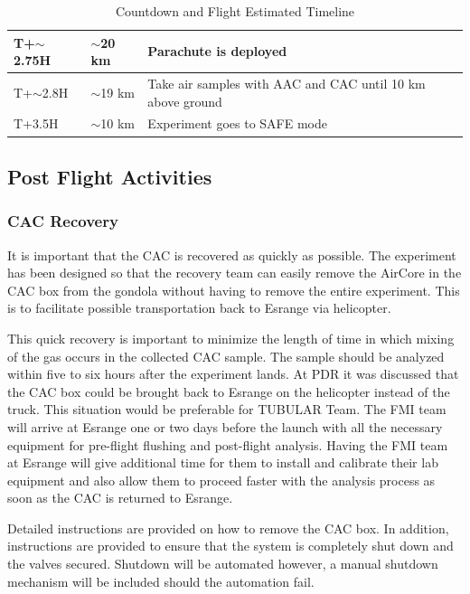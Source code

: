 \documentclass[a4paper,12pt,twoside]{article}
\providecommand{\DIFaddtex}[1]{{\protect\color{blue}\uwave{#1}}} %
\providecommand{\DIFaddFL}[1]{\DIFadd{#1}} %
\providecommand{\DIFaddbeginFL}{} %
\providecommand{\DIFaddendFL}{} %
\providecommand{\DIFadd}[1]{\texorpdfstring{\DIFaddtex{#1}}{#1}} %
\newcommand{\DIFaddincludegraphics}[2][]{{\color{blue}\fbox{\DIFOincludegraphics[#1]{#2}}}} %
\DeclareRobustCommand{\DIFaddbeginFL}{\DIFOaddbeginFL \let\includegraphics\DIFaddincludegraphics} %
\DeclareRobustCommand{\DIFaddendFL}{\DIFOaddendFL \let\includegraphics\DIFOincludegraphics} %
\begin{document}
\begin{table}[H]
\begin{tabular}{|l|l|l|}
T+$\sim$2.75H                    & $\sim$20 km                        & Parachute is deployed                                    \\ \hline
T+$\sim$2.8H                     & $\sim$19 km                        & Take air samples with AAC and CAC until 10 km above ground                 \\ \hline
T+3.5H                           & $\sim$10 km                         & Experiment goes to SAFE mode                             \\ \hline
\end{tabular}
\caption{Countdown and Flight Estimated Timeline\DIFaddbeginFL \DIFaddFL{.}\DIFaddendFL }
\label{tab:countflight}
\end{table}
\raggedbottom
\pagebreak
\subsection{Post Flight Activities}

\subsubsection{CAC Recovery}
It is important that the CAC is recovered as quickly as possible. The experiment has been designed so that the recovery team can easily remove the AirCore in the CAC box from the gondola without having to remove the entire experiment. This is to facilitate possible transportation back to Esrange via helicopter.

This quick recovery is important to minimize the length of time in which mixing of the gas occurs in the collected CAC sample. The sample should be analyzed within five to six hours after the experiment lands. At PDR it was discussed that the CAC box could be brought back to Esrange on the helicopter instead of the truck. This situation would be preferable for TUBULAR Team. 
The FMI team will arrive at Esrange one or two days before the launch with all the necessary equipment for pre-flight flushing and post-flight analysis. Having the FMI team at Esrange will give additional time for them to install and calibrate their lab equipment and also allow them to proceed faster with the analysis process as soon as the CAC is returned to Esrange. 

Detailed instructions are provided on how to remove the CAC box. In addition, instructions are provided to ensure that the system is completely shut down and the valves secured. Shutdown will be automated however, a manual shutdown mechanism will be included should the automation fail.
\end{document}
